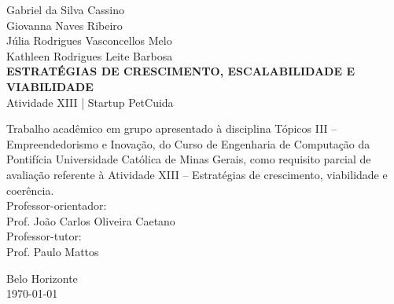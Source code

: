 \begin{folhaderosto}
\begin{center}
Gabriel da Silva Cassino\\Giovanna Naves Ribeiro\\Júlia Rodrigues Vasconcellos Melo\\Kathleen Rodrigues Leite Barbosa\\
\vspace{3cm}
{\Large\textbf{ESTRATÉGIAS DE CRESCIMENTO, ESCALABILIDADE E VIABILIDADE}}\\[.3cm]
{\large Atividade XIII | Startup PetCuida}
\vspace{2cm}
\end{center}
\hspace{.45\textwidth}\begin{minipage}{.5\textwidth}\small
Trabalho acadêmico em grupo apresentado à disciplina Tópicos III -- Empreendedorismo e Inovação, do Curso de Engenharia de Computação da Pontifícia Universidade Católica de Minas Gerais, como requisito parcial de avaliação referente à Atividade XIII -- Estratégias de crescimento, viabilidade e coerência.\\[.3cm]
Professor-orientador:\\ Prof. João Carlos Oliveira Caetano\\
Professor-tutor:\\ Prof. Paulo Mattos
\end{minipage}
\vfill
\begin{center}
Belo Horizonte\\ 
\today
\end{center}
\end{folhaderosto}